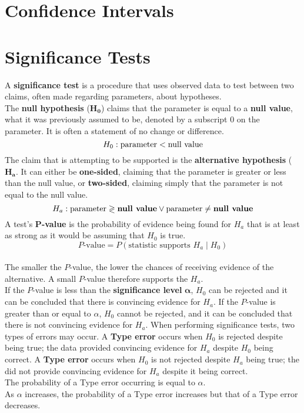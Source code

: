 \documentclass[../AP_Statistics.tex]{subfiles}
\begin{document}
	\chapter{Confidence Intervals}
	\chapter{Significance Tests}
		A \textbf{significance test} is a procedure that uses observed data to test between two claims, often made regarding parameters, about hypotheses. \\
		The \textbf{null hypothesis} ($\pmb{H_0}$) claims that the parameter is equal to a \textbf{null value}, what it was previously assumed to be, denoted by a subscript $0$ on the parameter. It is often a statement of no change or difference.
		$$H_0:\rm{parameter} < \text{null value}$$
		The claim that is attempting to be supported is the \textbf{alternative hypothesis} ($\pmb{H_a}$. It can either be \textbf{one-sided}, claiming that the parameter is greater or less than the null value, or \textbf{two-sided}, claiming simply that the parameter is not equal to the null value.
		$$H_a:\rm{parameter} \gtrless \textbf{null value} \lor \rm{parameter} \ne \textbf{null value}$$
		A test's $\pmb{P}$\textbf{-value} is the probability of evidence being found for $H_a$ that is at least as strong as it would be assuming that $H_0$ is true.
		$$P\text{-value} = P(\text{statistic supports } H_a \mid H_0)$$ \\
		The smaller the $P$-value, the lower the chances of receiving evidence of the alternative. A small $P$-value therefore supports the $H_a$. \\
		If the $P$-value is less than the \textbf{significance level} $\pmb{\alpha}$, $H_0$ can be rejected and it can be concluded that there is convincing evidence for $H_a$. If the $P$-value is greater than or equal to $\alpha$, $H_0$ cannot be rejected, and it can be concluded that there is not convincing evidence for $H_a$.
		When performing significance tests, two types of errors may occur. A \textbf{Type  error} occurs when $H_0$ is rejected despite being true; the data provided convincing evidence for $H_a$ despite $H_0$ being correct. A \textbf{Type  error} occurs when $H_0$ is not rejected despite $H_a$ being true; the did not provide convincing evidence for $H_a$ despite it being correct. \\
		The probability of a Type  error occurring is equal to $\alpha$. \\
		As $\alpha$ increases, the probability of a Type  error increases but that of a Type  error decreases.
\end{document}
